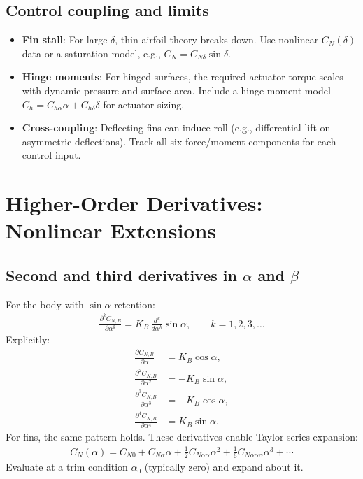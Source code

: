 \documentclass[11pt]{article}
\begin{document}
\subsection{Control coupling and limits}
\begin{itemize}[leftmargin=2em]
\item \textbf{Fin stall}: For large $\delta$, thin-airfoil theory breaks down. Use nonlinear $C_N(\delta)$ data or a saturation model, e.g., $C_N = C_{N\delta}\sin\delta$.
\item \textbf{Hinge moments}: For hinged surfaces, the required actuator torque scales with dynamic pressure and surface area. Include a hinge-moment model $C_h = C_{h\alpha}\alpha + C_{h\delta}\delta$ for actuator sizing.
\item \textbf{Cross-coupling}: Deflecting fins can induce roll (e.g., differential lift on asymmetric deflections). Track all six force/moment components for each control input.
\end{itemize}

\section{Higher-Order Derivatives: Nonlinear Extensions}

\subsection{Second and third derivatives in $\alpha$ and $\beta$}
For the body with $\sin\alpha$ retention:
\begin{align}
\frac{\partial^k C_{N,B}}{\partial\alpha^k} = K_B\,\frac{d^k}{d\alpha^k}\sin\alpha,\qquad k=1,2,3,\dots
\end{align}
Explicitly:
\begin{align}
\frac{\partial C_{N,B}}{\partial\alpha} &= K_B\cos\alpha,\\
\frac{\partial^2 C_{N,B}}{\partial\alpha^2} &= -K_B\sin\alpha,\\
\frac{\partial^3 C_{N,B}}{\partial\alpha^3} &= -K_B\cos\alpha,\\
\frac{\partial^4 C_{N,B}}{\partial\alpha^4} &= K_B\sin\alpha.
\end{align}
For fins, the same pattern holds. These derivatives enable Taylor-series expansion:
\begin{align}
C_N(\alpha) = C_{N0} + C_{N\alpha}\alpha + \frac{1}{2}C_{N\alpha\alpha}\alpha^2 + \frac{1}{6}C_{N\alpha\alpha\alpha}\alpha^3 + \cdots
\end{align}
Evaluate at a trim condition $\alpha_0$ (typically zero) and expand about it.
\end{document}
